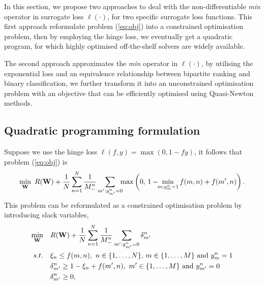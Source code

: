 In this section, we propose two approaches to deal with the non-differentiable \emph{min} operator in surrogate loss $\ell(\cdot)$,
for two specific surrogate loss functions.
This first approach reformulate problem (\ref{eq:obj}) into a constrained optimisation problem,
then by employing the hinge loss, we eventually get a quadratic program,
for which highly optimised off-the-shelf solvers are widely available.

The second approach approximates the \emph{min} operator in $\ell(\cdot)$, by utilising the exponential loss 
and an equivalence relationship between bipartite ranking and binary classification, 
we further transform it into an unconstrained optimisation problem with an objective that can be efficiently 
optimised using \eg Quasi-Newton methods.



\subsection{Quadratic programming formulation}

Suppose we use the hinge loss $\ell(f, y) = \max(0, 1 - fy)$, it follows that problem (\ref{eq:obj}) is
\begin{equation}
\label{eq:hingeobj}
\resizebox{.92\linewidth}{!}{$\displaystyle
\min_\W \ R(\W) + \frac{1}{N} \sum_{n=1}^N \frac{1}{M_-^n} \sum_{m': y_{m'}^n = 0} \!\!\!
          \max \left( 0, \, 1 - \!\! \min_{m: y_m^n = 1} f(m, n) + f(m', n) \right).
$}
\end{equation}
This problem can be reformulated as a constrained optimisation problem by introducing slack variables, \ie
\begin{equation}
\label{eq:hingeobj_cons}
\begin{aligned}
\min_\W \quad & R(\W) + \frac{1}{N} \sum_{n=1}^N \frac{1}{M_-^n} \sum_{m': y_{m'}^n = 0} \delta_{m'}^n \\
s.t. \quad 
& \xi_n \le f(m, n), \ n \in \{1,\dots,N\}, \, m \in \{1,\dots,M\} \ \mathrm{and} \ y_m^n = 1 \\
& \delta_{m'}^n \ge 1 - \xi_n + f(m', n), \ m' \in \{1,\dots,M\} \ \mathrm{and} \ y_{m'}^n = 0 \\
& \delta_{m'}^n \ge 0,
\end{aligned}
\end{equation}

